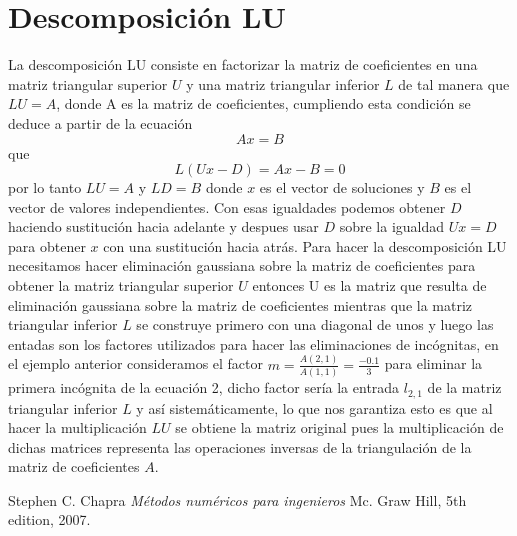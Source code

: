 \documentclass[10pt,twocolumn]{article}
\begin{document}
\section{Descomposici\'on LU}
La descomposici\'on LU consiste en factorizar la matriz de coeficientes en una matriz triangular superior $U$ y una matriz 
triangular inferior $L$ de tal manera que $LU=A$, donde A es la matriz de coeficientes, cumpliendo esta condici\'on se deduce a 
partir de la ecuaci\'on 
\begin{equation}
	Ax=B
\end{equation}
 que 
\begin{equation}
	L \left( Ux - D \right) = Ax - B =0 
\end {equation}
por lo tanto $LU=A$ y $LD=B$ donde $x$ es el vector de soluciones y $B$ es el vector de valores independientes. Con esas 
igualdades podemos obtener $D$ haciendo sustituci\'on hacia adelante y despues usar $D$ sobre la igualdad $Ux=D$ para obtener 
$x$ con una sustituci\'on hacia atr\'as. Para hacer 
la 
descomposici\'on LU necesitamos hacer eliminaci\'on gaussiana sobre la matriz de coeficientes para obtener la matriz triangular 
superior $U$ entonces U es la matriz que resulta de eliminaci\'on gaussiana sobre la matriz de coeficientes mientras que la 
matriz triangular inferior $L$ se construye primero con una diagonal de unos y luego las entadas son los factores utilizados 
para hacer las eliminaciones de inc\'ognitas, 
en el ejemplo anterior 
consideramos el factor $m=\frac{A(2,1)}{A(1,1)}= \frac{-0.1}{3} $ para eliminar la primera inc\'ognita de la ecuaci\'on 2, dicho 
factor ser\'ia la entrada $l_{2,1}$ de la matriz triangular inferior $L$ y as\'i sistem\'aticamente, lo que nos garantiza esto 
es que al hacer la multiplicaci\'on $LU$ se obtiene la matriz original pues la multiplicaci\'on de dichas matrices representa 
las operaciones inversas de la triangulaci\'on de la matriz de coeficientes $A$.

\begin{thebibliography}
	Stephen C. Chapra
	\emph{M\'etodos num\'ericos para ingenieros}
	Mc. Graw Hill, 5th edition, 2007.
\end{thebibliography}
\end{document}
